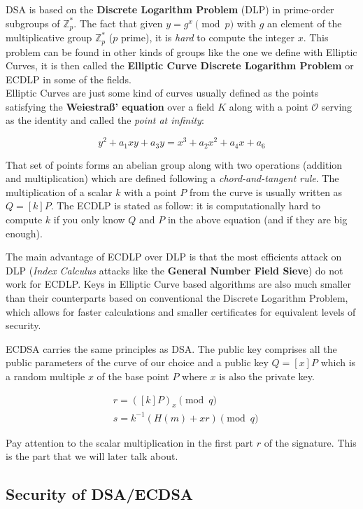 \documentclass[a4paper,11pt]{article}
\begin{document}
DSA is based on the \textbf{Discrete Logarithm Problem} (DLP) in prime-order subgroups of $\mathbb{Z}^{\ast}_p$. The fact that given $y = g^x \pmod{p}$ with $g$ an element of the multiplicative group $\mathbb{Z}_{p}^{\ast}$ ($p$ prime), it is \emph{hard} to compute the integer $x$. This problem can be found in other kinds of groups like the one we define with Elliptic Curves, it is then called the \textbf{Elliptic Curve Discrete Logarithm Problem} or ECDLP in some of the fields.\\

Elliptic Curves are just some kind of curves usually defined as the points satisfying the \textbf{Weiestraß' equation} over a field $K$ along with a point $\mathcal{O}$ serving as the identity and called the \textit{point at infinity}:

$$ y^2 + a_1xy + a_3y = x^3 + a_2x^2 + a_4x + a_6 $$

That set of points forms an abelian group along with two operations (addition and multiplication) which are defined following a \textit{chord-and-tangent rule}. The multiplication of a scalar $k$ with a point $P$ from the curve is usually written as $Q = [k]P$. The ECDLP is stated as follow: it is computationally hard to compute $k$ if you only know $Q$ and $P$ in the above equation (and if they are big enough).

The main advantage of ECDLP over DLP is that the most efficients attack on DLP (\textit{Index Calculus} attacks like the \textbf{General Number Field Sieve}) do not work for ECDLP. Keys in Elliptic Curve based algorithms are also much smaller than their counterparts based on conventional the Discrete Logarithm Problem, which allows for faster calculations and smaller certificates for equivalent levels of security. 

ECDSA carries the same principles as DSA. The public key comprises all the public parameters of the curve of our choice and a public key $Q = [x]P$ which is a random multiple $x$ of the base point $P$  where $x$ is also the private key.

\begin{align*}
&r = ([k]P)_x \pmod{q}\\
&s = k^{-1} ( H(m) + x r ) \pmod{q}
\end{align*}

Pay attention to the scalar multiplication in the first part $r$ of the signature. This is the part that we will later talk about.

\subsection{Security of DSA/ECDSA}\label{security_dsa_ecdsa}
\end{document}
